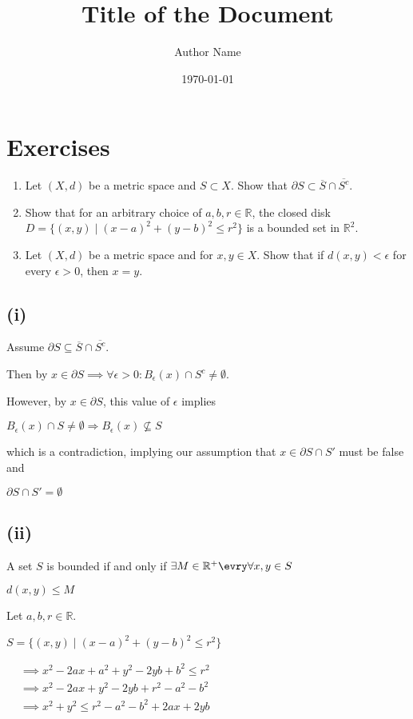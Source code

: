 \documentclass{article}
\title{\textbf{Title of the Document}}
\author{Author Name}
\date{\today}
\theoremstyle{definition}
\numberwithin{equation}{section}
\begin{document}
\maketitle
\tableofcontents
\newpage
\section{Exercises}
\begin{enumerate}
    \item Let $(X,d)$ be a metric space and $S \subset X$. Show that $\partial S \subset \overline{S} \cap \overline{S^c}$.
    \item Show that for an arbitrary choice of $a, b, r \in \mathbb{R}$, the closed disk $D = \{(x,y) \mid (x-a)^2 + (y-b)^2 \leq r^2\}$ is a bounded set in $\mathbb{R}^2$.
    \item Let $(X,d)$ be a metric space and for $x,y \in X$. Show that if $d(x,y) < \epsilon$ for every $\epsilon > 0$, then $x = y$.
\end{enumerate}

\subsection*{(i)}

Assume \(\partial S \subseteq \overline{S} \cap \overline{S^c}\).

Then by $x \in \partial S \implies \forall \epsilon > 0: B_\epsilon(x) \cap S^c \neq \emptyset$.

However, by $x \in \partial S$, this value of $\epsilon$ implies

$ B_\epsilon(x) \cap S \neq \emptyset  \Rightarrow B_\epsilon(x) \nsubseteq S $

which is a contradiction, implying our assumption that $x \in \partial S \cap S'$ must be false and

$ \partial S \cap S' = \emptyset $

\subsection*{(ii)}

A set $S$ is bounded if and only if $\exists M \in \mathbb{R}^+ \evry \forall x, y \in S$

$ d(x, y) \leq M $

Let $a, b, r \in \mathbb{R}$.

$ S = \{(x , y) \mid (x - a)^2 + (y - b)^2 \leq r^2\} $

$
\begin{aligned}
    &\implies x^2 - 2ax + a^2 + y^2 - 2yb + b^2 \leq r^2 \\
    &\implies x^2 - 2ax + y^2 - 2yb + r^2 - a^2 - b^2 \\
    &\implies x^2 + y^2 \leq r^2 - a^2 - b^2 + 2ax + 2yb
\end{aligned}
$
\end{document}
